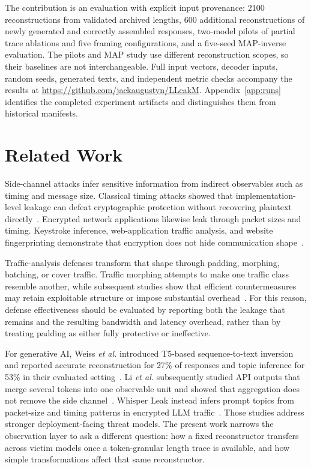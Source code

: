 \documentclass[electronics,article,submit,pdftex,moreauthors]{Definitions/mdpi}
\begin{document}
The contribution is an evaluation with explicit input provenance: 2100 reconstructions from validated archived lengths, 600 additional reconstructions of newly generated and correctly assembled responses, two-model pilots of partial trace ablations and five framing configurations, and a five-seed MAP-inverse evaluation. The pilots and MAP study use different reconstruction scopes, so their baselines are not interchangeable. Full input vectors, decoder inputs, random seeds, generated texts, and independent metric checks accompany the results at \url{https://github.com/jackaugustyn/LLeakM}. Appendix~\ref{app:runs} identifies the completed experiment artifacts and distinguishes them from historical manifests.

\section{Related Work}
Side-channel attacks infer sensitive information from indirect observables such as timing and message size. Classical timing attacks showed that implementation-level leakage can defeat cryptographic protection without recovering plaintext directly~\cite{kocher1996timing}. Encrypted network applications likewise leak through packet sizes and timing. Keystroke inference, web-application traffic analysis, and website fingerprinting demonstrate that encryption does not hide communication shape~\cite{song2001timing,chen2010sidechannel,cai2012touching,sirinam2018deep}.

Traffic-analysis defenses transform that shape through padding, morphing, batching, or cover traffic. Traffic morphing attempts to make one traffic class resemble another, while subsequent studies show that efficient countermeasures may retain exploitable structure or impose substantial overhead~\cite{wright2009morphing,dyer2012peekaboo}. For this reason, defense effectiveness should be evaluated by reporting both the leakage that remains and the resulting bandwidth and latency overhead, rather than by treating padding as either fully protective or ineffective.

For generative AI, Weiss \emph{et al.} introduced T5-based sequence-to-text inversion and reported accurate reconstruction for 27\% of responses and topic inference for 53\% in their evaluated setting~\cite{weiss2024prompt}. Li \emph{et al.} subsequently studied API outputs that merge several tokens into one observable unit and showed that aggregation does not remove the side channel~\cite{li2026length}. Whisper Leak instead infers prompt topics from packet-size and timing patterns in encrypted LLM traffic~\cite{whisperleak2025}. Those studies address stronger deployment-facing threat models. The present work narrows the observation layer to ask a different question: how a fixed reconstructor transfers across victim models once a token-granular length trace is available, and how simple transformations affect that same reconstructor.
\end{document}
